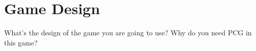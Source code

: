 \section{Game Design}
\label{03}

What’s the design of the game you are going to use? Why do you need PCG in this game?